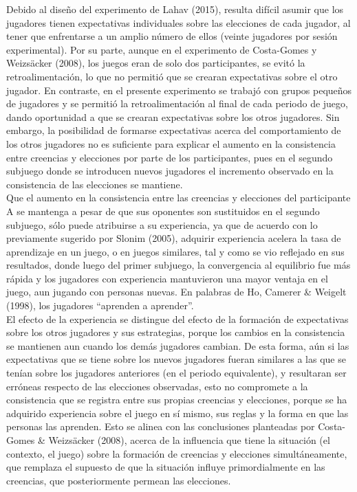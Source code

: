 Debido al diseño del experimento de Lahav (2015), resulta difícil asumir que los jugadores tienen expectativas individuales sobre las elecciones de cada jugador, al tener que enfrentarse a un amplio número de ellos (veinte jugadores por sesión experimental). Por su parte, aunque en el experimento de Costa-Gomes y Weizsäcker (2008), los juegos eran de solo dos participantes, se evitó la retroalimentación, lo que no permitió que se crearan expectativas sobre el otro jugador. En contraste, en el presente experimento se trabajó con grupos pequeños de jugadores y se permitió la retroalimentación al final de cada periodo de juego, dando oportunidad a que se crearan expectativas sobre los otros jugadores. Sin embargo, la  posibilidad de formarse expectativas acerca del comportamiento de los otros jugadores no es suficiente para explicar el aumento en la consistencia entre creencias y elecciones por parte de los participantes, pues en el segundo subjuego donde se introducen nuevos jugadores el incremento observado en la consistencia de las elecciones se mantiene.\\

Que el aumento en la consistencia entre las creencias y elecciones del participante A se mantenga a pesar de que sus oponentes son sustituidos en el segundo subjuego, sólo puede atribuirse a su experiencia, ya que de acuerdo con lo previamente sugerido por Slonim (2005), adquirir experiencia acelera la tasa de aprendizaje en un juego, o en juegos similares, tal y como se vio  reflejado en sus resultados, donde luego del primer subjuego, la convergencia al equilibrio fue más rápida y los jugadores con experiencia mantuvieron una mayor ventaja en el juego, aun jugando con personas nuevas. En palabras de Ho, Camerer & Weigelt (1998), los jugadores “aprenden a aprender”.\\

El efecto de la experiencia se distingue del efecto de la formación de expectativas sobre los otros jugadores y sus estrategias, porque los cambios en la consistencia se mantienen aun cuando los demás jugadores cambian. De esta forma, aún si las expectativas que se tiene sobre los nuevos jugadores fueran similares a las que se tenían sobre los jugadores anteriores (en el periodo equivalente), y resultaran ser erróneas respecto de las elecciones observadas, esto no compromete a la consistencia que se registra entre sus propias creencias y elecciones, porque se ha adquirido experiencia sobre el juego en sí mismo, sus reglas y la forma en que las personas las aprenden. Esto se alinea con las conclusiones planteadas por Costa-Gomes & Weizsäcker (2008), acerca de la influencia que tiene la situación (el contexto, el juego) sobre la formación de creencias y elecciones simultáneamente, que remplaza el supuesto de que la situación influye primordialmente en las creencias, que posteriormente permean las elecciones.\\

